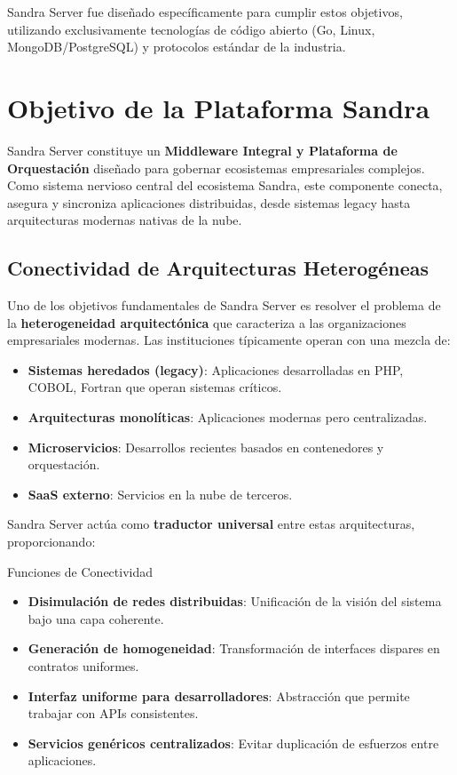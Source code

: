 Sandra Server fue diseñado específicamente para cumplir estos objetivos, utilizando exclusivamente tecnologías de código abierto (Go, Linux, MongoDB/PostgreSQL) y protocolos estándar de la industria.

\newpage

\section{Objetivo de la Plataforma Sandra}

Sandra Server constituye un \textbf{Middleware Integral y Plataforma de Orquestación} diseñado para gobernar ecosistemas empresariales complejos. Como sistema nervioso central del ecosistema Sandra, este componente conecta, asegura y sincroniza aplicaciones distribuidas, desde sistemas legacy hasta arquitecturas modernas nativas de la nube.

\subsection{Conectividad de Arquitecturas Heterogéneas}

Uno de los objetivos fundamentales de Sandra Server es resolver el problema de la \textbf{heterogeneidad arquitectónica} que caracteriza a las organizaciones empresariales modernas. Las instituciones típicamente operan con una mezcla de:

\begin{itemize}
\item \textbf{Sistemas heredados (legacy)}: Aplicaciones desarrolladas en PHP, COBOL, Fortran que operan sistemas críticos.
\item \textbf{Arquitecturas monolíticas}: Aplicaciones modernas pero centralizadas.
\item \textbf{Microservicios}: Desarrollos recientes basados en contenedores y orquestación.
\item \textbf{SaaS externo}: Servicios en la nube de terceros.
\end{itemize}

Sandra Server actúa como \textbf{traductor universal} entre estas arquitecturas, proporcionando:

\begin{caja}{Funciones de Conectividad}
\begin{itemize}
\item \textbf{Disimulación de redes distribuidas}: Unificación de la visión del sistema bajo una capa coherente.
\item \textbf{Generación de homogeneidad}: Transformación de interfaces dispares en contratos uniformes.
\item \textbf{Interfaz uniforme para desarrolladores}: Abstracción que permite trabajar con APIs consistentes.
\item \textbf{Servicios genéricos centralizados}: Evitar duplicación de esfuerzos entre aplicaciones.
\end{itemize}
\end{caja}

